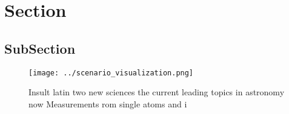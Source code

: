 \documentclass[a4paper]{article}
\begin{document}
\section{Section}

\subsection{SubSection}

\begin{figure}
\centering
\texttt{[image: ../scenario\_visualization.png]}
\caption{Insult latin two new sciences the current leading topics in astronomy now Measurements rom single atoms and i
}
\end{figure}
 
\end{document}
